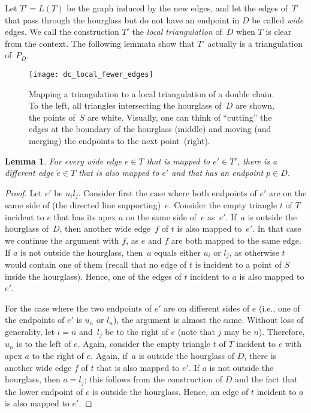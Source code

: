 \documentclass[11pt,a4paper]{article}
\newcommand{\myqed}{\qed}
\renewcommand{\myqed}{}
\newtheorem{lemma}[theorem]{Lemma}
\begin{document}
Let  $T' = L(T)$ be the graph induced by the new edges, and let the edges of~$T$ that pass through the hourglass but do not have an endpoint in $D$ be called \emph{wide} edges.
We call the construction $T'$ the \emph{local triangulation} of~$D$ when $T$ is clear from the context.
The following lemmata show that $T'$ actually is a triangulation of~$P_D$.

\begin{figure}
\centering
\texttt{[image: dc\_local\_fewer\_edges]}
\caption{Mapping a triangulation to a local triangulation of a double chain.
To the left, all triangles intersecting the hourglass of~$D$ are shown, the points of~$S$ are white.
Visually, one can think of ``cutting'' the edges at the boundary of the hourglass (middle) and moving (and merging) the endpoints to the next point~(right).}
\label{fig_dc_local}
\end{figure}

\begin{lemma}\label{lem_no_wide}
For every wide edge $e \in T$ that is mapped to $e' \in T'$, there is a different edge $\tilde e \in T$ that is also mapped to $e'$ and that has an endpoint $p \in D$.
\end{lemma}
\begin{proof}
Let $e'$ be $u_i l_j$.
Consider first the case where both endpoints of $e'$ are on the same side of (the directed line supporting)~$e$.
Consider the empty triangle $t$ of $T$ incident to $e$ that has its apex $a$ on the same side of~$e$ as~$e'$.
If~$a$ is outside the hourglass of~$D$, then another wide edge~$f$ of $t$ is also mapped to~$e'$.
In that case we continue the argument with $f$, as $e$ and $f$ are both mapped to the same edge.
If $a$ is not outside the hourglass, then~$a$ equals either $u_i$ or $l_j$, as otherwise $t$ would contain one of them (recall that no edge of $t$ is incident to a point of $S$ inside the hourglass).
Hence, one of the edges of $t$ incident to $a$ is also mapped to $e'$.

For the case where the two endpoints of $e'$ are on different sides of $e$ (i.e., one of the endpoints of $e'$ is $u_n$ or $l_n$), the argument is almost the same.
Without loss of generality, let $i=n$ and~$l_j$ be to the right of $e$ (note that $j$ may be $n$).
Therefore, $u_n$ is to the left of $e$.
Again, consider the empty triangle $t$ of $T$ incident to $e$ with apex $a$ to the right of $e$.
Again, if~$a$ is outside the hourglass of $D$, there is another wide edge $f$ of $t$ that is also mapped to $e'$.
If $a$ is not outside the hourglass, then $a = l_j$; this follows from the construction of $D$ and the fact that the lower endpoint of $e$ is outside the hourglass.
Hence, an edge of $t$ incident to $a$ is also mapped to $e'$.
\myqed
\end{proof}
\end{document}
